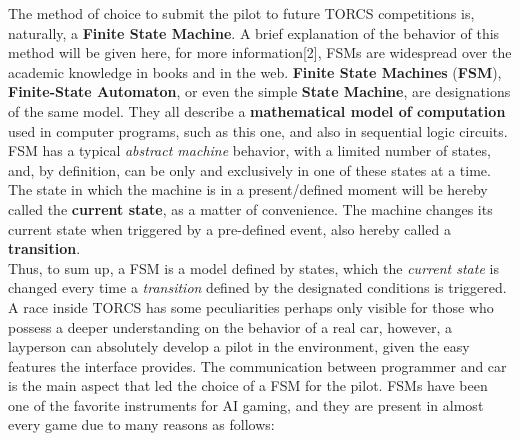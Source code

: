 The method of choice to submit the pilot to future TORCS competitions is, naturally, a \textbf{Finite State Machine}. A brief explanation of the behavior of this method will be given here, for more information[2], FSMs are widespread over the academic knowledge in books and in the web.
\textbf{Finite State Machines} (\textbf{FSM}), \textbf{Finite-State Automaton}, or even the simple \textbf{State Machine}, are designations of the same model. They all describe a \textbf{mathematical model of computation} used in computer programs, such as this one, and also in sequential logic circuits. FSM has a typical \textit{abstract machine} behavior, with a limited number of states, and, by definition, can be only and exclusively in one of these states at a time. The state in which the machine is in a present/defined moment will be hereby called the \textbf{current state}, as a matter of convenience. The machine changes its current state when triggered by a pre-defined event, also hereby called a \textbf{transition}.\\
Thus, to sum up, a FSM is a model defined by states, which the \textit{current state} is changed every time a \textit{transition} defined by the designated conditions is triggered.\\[0.2cm]
A race inside TORCS has some peculiarities perhaps only visible for those who possess a deeper understanding on the behavior of a real car, however, a layperson can absolutely develop a pilot in the environment, given the easy features the interface provides. The communication between programmer and car is the main aspect that led the choice of a FSM for the pilot. FSMs have been one of the favorite instruments for AI gaming, and they are present in almost every game due to many reasons as follows:

